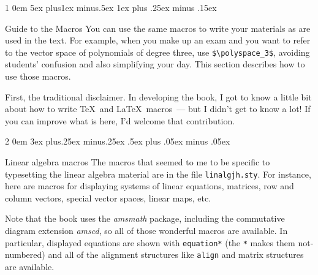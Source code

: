 \documentclass[titlepage]{article}
\makeatletter
\renewcommand{\section}{\@startsection{section}%
  {1}%
  {0em}%
  {5ex plus1ex minus.5ex}%
  {1ex plus .25ex minus .15ex}%
  {\large\bfseries\raggedright}}
\renewcommand{\subsection}{\@startsection{subsection}%
  {2}%
  {0em}%
  {3ex plus.25ex minus.25ex}%
  {.5ex plus .05ex minus .05ex}%
  {\bfseries\raggedright}}
\makeatother
\begin{document}











\section{Guide to the Macros}
You can use the same
macros to write your materials as are used in the text.
For example, when you make up an exam and you want to
refer to the vector space of polynomials of degree three, 
use \verb!$\polyspace_3$!,
avoiding students' confusion and also simplifying your day.  
This section describes how to use those macros.

First, the traditional disclaimer.
In developing the book, I got to know a little bit about how to write
\TeX\ and \LaTeX\ macros~--- but I didn't get to know a lot!
If you can improve what is here, I'd welcome that contribution.


\subsection{Linear algebra macros}
The macros that seemed to me to be specific to typesetting the
linear algebra material are in the file 
\texttt{linalgjh.sty}.
For instance, here are macros for displaying systems of linear equations,
matrices, row and column vectors, special vector spaces, linear maps,
etc.

Note that the book uses the \textit{amsmath} package, 
including the commutative diagram extension \textit{amscd},
so all of those
wonderful macros are available.
In particular, displayed equations are shown with 
\verb|equation*| (the \texttt{*} makes them not-numbered) and all of the 
alignment structures like \verb|align| and matrix structures 
are available.
\end{document}
